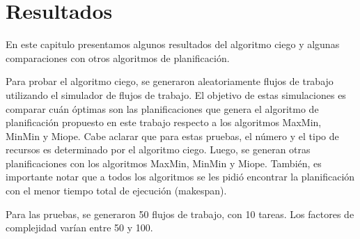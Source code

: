 \chapter{Resultados}

En este capitulo presentamos algunos resultados del algoritmo ciego y algunas comparaciones con otros algoritmos de planificación. 

Para probar el algoritmo ciego, se generaron aleatoriamente flujos de trabajo utilizando el simulador de flujos de trabajo. El objetivo de estas simulaciones es comparar cuán óptimas son las planificaciones que genera el algoritmo de planificación propuesto en este trabajo respecto a los algoritmos MaxMin, MinMin y Miope. Cabe aclarar que para estas pruebas, el número y el tipo de recursos es determinado por el algoritmo ciego. Luego, se generan otras planificaciones con los algoritmos MaxMin, MinMin y Miope. También, es importante notar que a todos los algoritmos se les pidió encontrar la planificación con el menor tiempo total de ejecución (makespan).


Para las pruebas, se generaron 50 flujos de trabajo, con 10 tareas. Los factores de complejidad varían entre 50 y 100.

